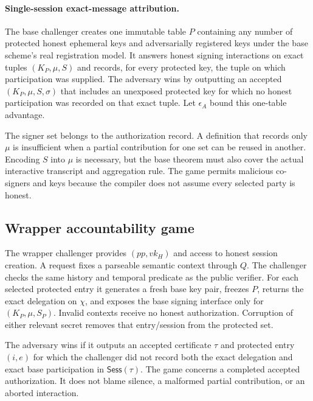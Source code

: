 \documentclass[11pt]{article}
\theoremstyle{definition}
\begin{document}
\paragraph{Single-session exact-message attribution.}
The base challenger creates one immutable table $P$ containing any number of protected honest ephemeral keys and adversarially registered keys under the base scheme's real registration model.  It answers honest signing interactions on exact tuples $(K_P,\mu,S)$ and records, for every protected key, the tuple on which participation was supplied.  The adversary wins by outputting an accepted $(K_P,\mu,S,\sigma)$ that includes an unexposed protected key for which no honest participation was recorded on that exact tuple.  Let $\epsilon_A$ bound this one-table advantage.

The signer set belongs to the authorization record.  A definition that records only $\mu$ is insufficient when a partial contribution for one set can be reused in another.  Encoding $S$ into $\mu$ is necessary, but the base theorem must also cover the actual interactive transcript and aggregation rule.  The game permits malicious co-signers and keys because the compiler does not assume every selected party is honest.

\subsection{Wrapper accountability game}
The wrapper challenger provides $(pp,vk_H)$ and access to honest session creation.  A request fixes a parseable semantic context through $Q$.  The challenger checks the same history and temporal predicate as the public verifier.  For each selected protected entry it generates a fresh base key pair, freezes $P$, returns the exact delegation on $\chi$, and exposes the base signing interface only for $(K_P,\mu,S_P)$.  Invalid contexts receive no honest authorization.  Corruption of either relevant secret removes that entry/session from the protected set.

The adversary wins if it outputs an accepted certificate $\tau$ and protected entry $(i,e)$ for which the challenger did not record both the exact delegation and exact base participation in $\mathsf{Sess}(\tau)$.  The game concerns a completed accepted authorization.  It does not blame silence, a malformed partial contribution, or an aborted interaction.
\end{document}
